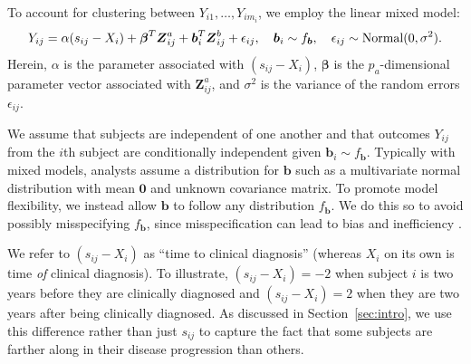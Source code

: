 \documentclass[12pt]{article}
\def\Normal{\hbox{Normal}}
\def\bse{\begin{eqnarray*}}
\def\ese{\end{eqnarray*}}
\def\bse{\begin{eqnarray*}}
\def\ese{\end{eqnarray*}}
\def\bzero{{\mathbf 0}}
\def\bbeta{{\boldsymbol{\beta}}}
\def\bzero{{\boldsymbol{0}}}
\def\bb{{\boldsymbol b}}
\def\bZ{{\boldsymbol Z}}
\begin{document}
To account for clustering between $Y_{i1},\ldots,Y_{im_i}$, we employ the linear mixed model:
\bse
Y_{ij} =
\alpha(s_{ij} - X_i) + \bbeta^T \bZ^a_{ij} + \bb_i^T \bZ^b_{ij} + \epsilon_{ij}, \ \ \ \bb_i\sim f_{\bb}, \ \ \ \epsilon_{ij}\sim\Normal(0,\sigma^2).\ese
Herein, $\alpha$ is the parameter associated with $(s_{ij} - X_i)$, $\bbeta$ is the $p_a$-dimensional parameter vector associated with $\bZ^a_{ij}$, and $\sigma^2$ is the variance of the random errors $\epsilon_{ij}$.

We assume that subjects are independent of one another and that outcomes $Y_{ij}$ from the $i$th subject are conditionally independent given $\bb_i\sim f_{\bb}$. Typically with mixed models, analysts assume a distribution for $\bb$ such as a multivariate normal distribution with mean $\bzero$ and unknown covariance matrix. To promote model flexibility, we instead allow $\bb$ to follow any distribution $f_{\bb}$. We do this so to avoid possibly misspecifying $f_{\bb}$, since misspecification can lead to bias and inefficiency \citep{garcia2016optimal}.

We refer to $(s_{ij} - X_i)$ as ``time to clinical diagnosis'' (whereas $X_i$ on its own is time \textit{of} clinical diagnosis). To illustrate, $(s_{ij} - X_i) = -2$ when subject $i$ is two years before they are clinically diagnosed and $(s_{ij} - X_i) = 2$ when they are two years after being clinically diagnosed. As discussed in Section~\ref{sec:intro}, we use this difference rather than just $s_{ij}$ to capture the fact that some subjects are farther along in their disease progression than others.
\end{document}
